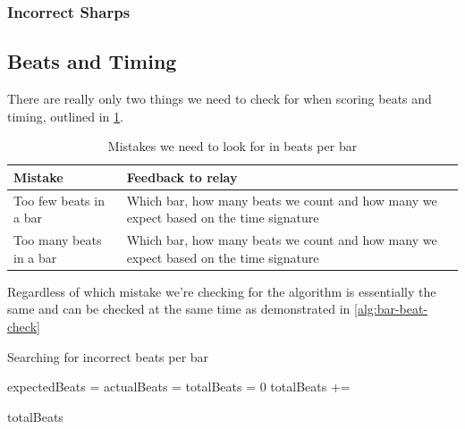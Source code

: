 \subsubsection{Incorrect Sharps}


\subsection{Beats and Timing}

There are really only two things we need to check for when scoring beats and timing, outlined in \cref{table:bar-beat-errors}.

\begin{table}[H]
    \renewcommand{\arraystretch}{1.6}
    \begin{tabularx}{\textwidth}{ lX }
        \toprule
        Mistake & Feedback to relay \\
        \midrule
        Too few beats in a bar & Which bar, how many beats we count and how many we expect based on the time signature \\
        Too many beats in a bar & Which bar, how many beats we count and how many we expect based on the time signature \\
        \bottomrule
    \end{tabularx}

    \caption{Mistakes we need to look for in beats per bar}
    \label{table:bar-beat-errors}
\end{table}

Regardless of which mistake we're checking for the algorithm is essentially the same and can be checked at the same time as demonstrated in \cref{alg:bar-beat-check}

\begin{algorithm}[H]
  \caption{Searching for incorrect beats per bar}
  \label{alg:bar-beat-check}

  \begin{algorithmic}
          \State expectedBeats = 
          \State actualBeats = 
          \EndIf
    	\EndFor
    \EndProcedure
    \Statex
        \State totalBeats = 0
          \State totalBeats += 
        \EndFor

    	\Return totalBeats
    \EndProcedure
  \end{algorithmic}
\end{algorithm}

